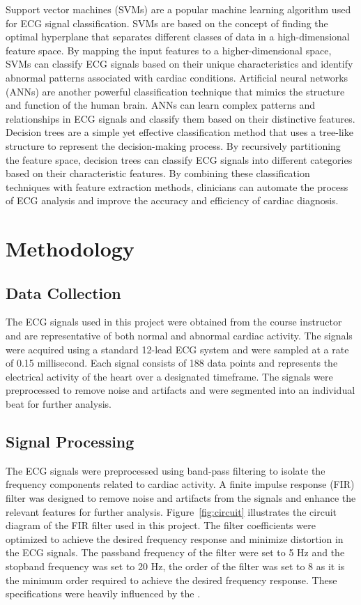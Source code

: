 \documentclass{zc-ust-hw}
\begin{document}
Support vector machines (SVMs) are a popular machine learning algorithm used
for ECG signal classification. SVMs are based on the concept of finding the
optimal hyperplane that separates different classes of data in a high-dimensional
feature space. By mapping the input features to a higher-dimensional space, SVMs
can classify ECG signals based on their unique characteristics and identify
abnormal patterns associated with cardiac conditions. Artificial neural networks
(ANNs) are another powerful classification technique that mimics the structure
and function of the human brain. ANNs can learn complex patterns and relationships
in ECG signals and classify them based on their distinctive features. Decision
trees are a simple yet effective classification method that uses a tree-like
structure to represent the decision-making process. By recursively partitioning
the feature space, decision trees can classify ECG signals into different
categories based on their characteristic features. By combining these
classification techniques with feature extraction methods, clinicians can
automate the process of ECG analysis and improve the accuracy and efficiency of
cardiac diagnosis. \cite{gacek_2012_ecg}

\section{Methodology}

\subsection{Data Collection}

The ECG signals used in this project were obtained from the course instructor
and are representative of both normal and abnormal cardiac activity. The signals
were acquired using a standard 12-lead ECG system and were sampled at a rate of
0.15 millisecond. Each signal consists of 188 data points and represents the
electrical activity of the heart over a designated timeframe. The signals were
preprocessed to remove noise and artifacts and were segmented into an individual
beat for further analysis. 

\subsection{Signal Processing}

The ECG signals were preprocessed using band-pass filtering to isolate the
frequency components related to cardiac activity. A finite impulse response
(FIR) filter was designed to remove noise and artifacts from the signals and
enhance the relevant features for further analysis. Figure~\ref{fig:circuit}
illustrates the circuit diagram of the FIR filter used in this project. The
filter coefficients were optimized to achieve the desired frequency response
and minimize distortion in the ECG signals. The passband frequency of the
filter were set to 5 Hz and the stopband frequency was set to 20 Hz, the order
of the filter was set to 8 as it is the minimum order required to achieve the
desired frequency response. These specifications were heavily influenced by the
\cite{marchon2019efficient}.
\end{document}
